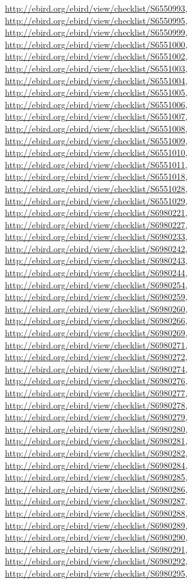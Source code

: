 \documentclass[9pt, article]{memoir}
\begin{document}
\begin{multicols}{2}
\url{http://ebird.org/ebird/view/checklist/S6550993}, 
\url{http://ebird.org/ebird/view/checklist/S6550995}, 
\url{http://ebird.org/ebird/view/checklist/S6550999}, 
\url{http://ebird.org/ebird/view/checklist/S6551000}, 
\url{http://ebird.org/ebird/view/checklist/S6551002}, 
\url{http://ebird.org/ebird/view/checklist/S6551003}, 
\url{http://ebird.org/ebird/view/checklist/S6551004}, 
\url{http://ebird.org/ebird/view/checklist/S6551005}, 
\url{http://ebird.org/ebird/view/checklist/S6551006}, 
\url{http://ebird.org/ebird/view/checklist/S6551007}, 
\url{http://ebird.org/ebird/view/checklist/S6551008}, 
\url{http://ebird.org/ebird/view/checklist/S6551009}, 
\url{http://ebird.org/ebird/view/checklist/S6551010}, 
\url{http://ebird.org/ebird/view/checklist/S6551011}, 
\url{http://ebird.org/ebird/view/checklist/S6551018}, 
\url{http://ebird.org/ebird/view/checklist/S6551028}, 
\url{http://ebird.org/ebird/view/checklist/S6551029}, 
\url{http://ebird.org/ebird/view/checklist/S6980221}, 
\url{http://ebird.org/ebird/view/checklist/S6980227}, 
\url{http://ebird.org/ebird/view/checklist/S6980233}, 
\url{http://ebird.org/ebird/view/checklist/S6980242}, 
\url{http://ebird.org/ebird/view/checklist/S6980243}, 
\url{http://ebird.org/ebird/view/checklist/S6980244}, 
\url{http://ebird.org/ebird/view/checklist/S6980254}, 
\url{http://ebird.org/ebird/view/checklist/S6980259}, 
\url{http://ebird.org/ebird/view/checklist/S6980260}, 
\url{http://ebird.org/ebird/view/checklist/S6980266}, 
\url{http://ebird.org/ebird/view/checklist/S6980269}, 
\url{http://ebird.org/ebird/view/checklist/S6980271}, 
\url{http://ebird.org/ebird/view/checklist/S6980272}, 
\url{http://ebird.org/ebird/view/checklist/S6980274}, 
\url{http://ebird.org/ebird/view/checklist/S6980276}, 
\url{http://ebird.org/ebird/view/checklist/S6980277}, 
\url{http://ebird.org/ebird/view/checklist/S6980278}, 
\url{http://ebird.org/ebird/view/checklist/S6980279}, 
\url{http://ebird.org/ebird/view/checklist/S6980280}, 
\url{http://ebird.org/ebird/view/checklist/S6980281}, 
\url{http://ebird.org/ebird/view/checklist/S6980282}, 
\url{http://ebird.org/ebird/view/checklist/S6980284}, 
\url{http://ebird.org/ebird/view/checklist/S6980285}, 
\url{http://ebird.org/ebird/view/checklist/S6980286}, 
\url{http://ebird.org/ebird/view/checklist/S6980287}, 
\url{http://ebird.org/ebird/view/checklist/S6980288}, 
\url{http://ebird.org/ebird/view/checklist/S6980289}, 
\url{http://ebird.org/ebird/view/checklist/S6980290}, 
\url{http://ebird.org/ebird/view/checklist/S6980291}, 
\url{http://ebird.org/ebird/view/checklist/S6980292}, 
\url{http://ebird.org/ebird/view/checklist/S6980295}, 

\end{multicols}
\end{document}
